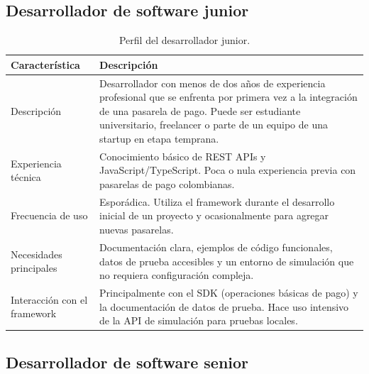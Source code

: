 \documentclass[10pt]{article}
\begin{document}
\subsection{Desarrollador de software junior}

\begin{table}[htbp]
  \centering
  \renewcommand{\arraystretch}{1.2}
  \begin{tabularx}{\textwidth}{|l|X|}
    \hline
    \textbf{Característica} & \textbf{Descripción} \\
    \hline
    Descripción & Desarrollador con menos de dos años de experiencia profesional que se enfrenta por primera vez a la integración de una pasarela de pago. Puede ser estudiante universitario, freelancer o parte de un equipo de una startup en etapa temprana. \\
    \hline
    Experiencia técnica & Conocimiento básico de REST APIs y JavaScript/TypeScript. Poca o nula experiencia previa con pasarelas de pago colombianas. \\
    \hline
    Frecuencia de uso & Esporádica. Utiliza el framework durante el desarrollo inicial de un proyecto y ocasionalmente para agregar nuevas pasarelas. \\
    \hline
    Necesidades principales & Documentación clara, ejemplos de código funcionales, datos de prueba accesibles y un entorno de simulación que no requiera configuración compleja. \\
    \hline
    Interacción con el framework & Principalmente con el SDK (operaciones básicas de pago) y la documentación de datos de prueba. Hace uso intensivo de la API de simulación para pruebas locales. \\
    \hline
  \end{tabularx}
  \caption{Perfil del desarrollador junior.}
  \label{tab:perfil-junior}
\end{table}

\subsection{Desarrollador de software senior}
\end{document}
